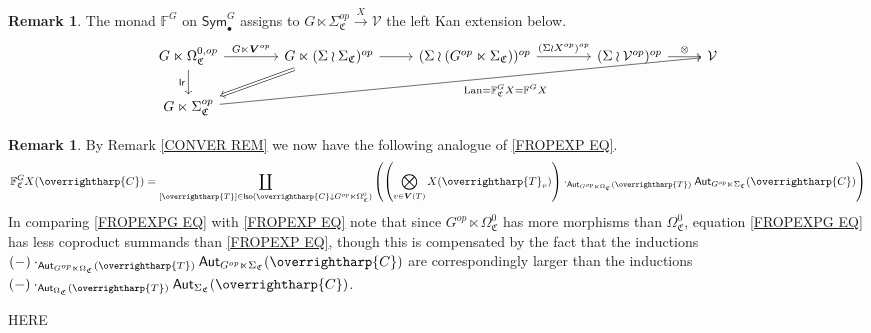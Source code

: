 \documentclass[a4paper,10pt
,draft
]{article}%
\numberwithin{equation}{section}
\numberwithin{figure}{section}
\theoremstyle{definition} %
\newtheorem{remark}[equation]{Remark}%
\newcommand{\vect}[1]{\text{\overrightharp{\ensuremath{#1}}}}
\DeclareMathOperator{\Lan}{Lan}%
\newcommand{\V}{\ensuremath{\mathcal V}}
\newcommand{\1}{\ensuremath{\mathbbm 1}}%
\begin{document}
\begin{remark}\label{FGC REM}
The monad $\mathbb{F}^G$ on $\mathsf{Sym}^G_{\bullet}$
assigns to 
$G \ltimes \Sigma^{op}_{\mathfrak{C}} \xrightarrow{X} \V$
the left Kan extension below.
\begin{equation}\label{FGC_EQ}
	\begin{tikzcd} %
		G \ltimes \Omega^{0,op}_{\mathfrak{C}}
		\arrow[d, "\mathsf{lr}"']
		\arrow[r, "G \ltimes \boldsymbol{V}^{op}"]
	&[15pt]
		G \ltimes (\Sigma \wr \Sigma_{\mathfrak{C}})^{op} \arrow{r}
		\arrow[dl, Rightarrow]
	&
		(\Sigma \wr (G^{op} \ltimes \Sigma_{\mathfrak{C}}))^{op} \arrow[r, "(\Sigma \wr X^{op})^{op}"]
	&[15pt]
		(\Sigma \wr \V^{op})^{op} \arrow[r, "\otimes"]
	&
		\V
\\
	G\ltimes\Sigma^{op}_{\mathfrak{C}}
	\arrow[urrrr, "\Lan = \mathbb F_{\mathfrak{C}}^G X = \mathbb F^G X"']
	\end{tikzcd}
\end{equation}
\end{remark}







\begin{remark}
By Remark \ref{CONVER REM} we now have the following analogue of
\eqref{FROPEXP EQ}.
\begin{equation}\label{FROPEXPG EQ}
\mathbb{F}^G_{\mathfrak{C}} X (\vect{C})
=
\coprod_{[\vect{T}] \in 
\mathsf{Iso}(\vect{C} \downarrow G^{op} \ltimes \Omega^0_{\mathfrak{C}})}
\left(
\left(
\bigotimes_{v \in \boldsymbol{V}(T)} X(\vect{T}_v)
\right)
\cdot_{\mathsf{Aut}_{G^{op} \ltimes \Omega_{\mathfrak{C}}}(\vect{T})}
\mathsf{Aut}_{G^{op} \ltimes \Sigma_{\mathfrak{C}}}(\vect{C})
\right)
\end{equation}
In comparing \eqref{FROPEXPG EQ} with \eqref{FROPEXP EQ} note that since 
$G^{op} \ltimes \Omega^0_{\mathfrak{C}}$
has more morphisms than
$\Omega^0_{\mathfrak{C}}$,
equation \eqref{FROPEXPG EQ} has less coproduct summands than \eqref{FROPEXP EQ},
though this is compensated by the fact that the inductions
$(-)\cdot_{\mathsf{Aut}_{G^{op} \ltimes \Omega_{\mathfrak{C}}}(\vect{T})}
\mathsf{Aut}_{G^{op} \ltimes \Sigma_{\mathfrak{C}}}(\vect{C})$
are correspondingly larger than the inductions
$(-)\cdot_{\mathsf{Aut}_{\Omega_{\mathfrak{C}}}(\vect{T})}
\mathsf{Aut}_{\Sigma_{\mathfrak{C}}}(\vect{C})$.
\end{remark}




{\color{red} HERE}
\end{document}
